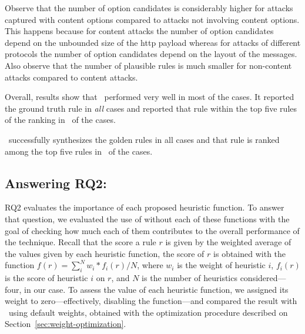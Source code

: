 \documentclass[sigconf,review, anonymous]{acmart}
\begin{document}
Observe that the number of option candidates is considerably higher
for attacks captured with content options compared to attacks not
involving content options. This happens because for content attacks
the number of option candidates depend on the unbounded size of the
http payload whereas for attacks of different protocols the number of
option candidates depend on the layout of the messages. Also observe
that the number of plausible rules is much smaller for non-content
attacks compared to content attacks.


Overall, results show that \tname\ performed very well in most of the
cases. It reported the ground truth rule in \emph{all} cases and
reported that rule within the top five rules of the ranking in
\percTopFiveRanking\ of the cases. 


\begin{center}
\begin{tcolorbox}[enhanced,width=3.3in,center upper,drop shadow southwest,sharp corners]
\tname\ successfully synthesizes the golden rules in all cases and
that rule is ranked among the top five rules in
\percTopFiveRanking\ of the cases.
\end{tcolorbox}
\end{center}


\subsection{Answering RQ2: \textRQtwo}
\label{sec:answer-rqtwo}

RQ2 evaluates the importance of each proposed heuristic function. To
answer that question, we evaluated the use of \tname{} without each of
these functions with the goal of checking how much each of them
contributes to the overall performance of the technique. Recall that
the score a rule $r$ is given by the weighted average of the values
given by each heuristic function, \ie{} the score of $r$ is obtained
with the function $f(r)=\sum_{i}^{N} w_i*f_i(r)/N$, where $w_i$ is the
weight of heuristic $i$, $f_i(r)$ is the score of heuristic $i$ on
$r$, and $N$ is the number of heuristics considered---four, in our
case. To assess the value of each heuristic function, we assigned its
weight to zero---effectively, disabling the function---and compared
the result with \tname\ using default weights, obtained with the
optimization procedure described on
Section~\ref{sec:weight-optimization}.
\end{document}
